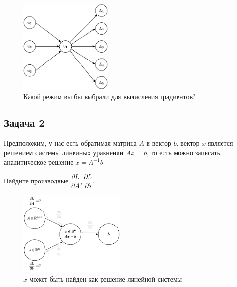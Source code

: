 \documentclass[
  russian,
  letterpaper,
  DIV=11,
  numbers=noendperiod]{scrartcl}
\begin{document}
\begin{figure}[H]

{\centering \includegraphics[width=1.82292in,height=\textheight,keepaspectratio]{ad_choose.pdf}

}

\caption{Какой режим вы бы выбрали для вычисления градиентов?}

\end{figure}%

\subsection{Задача 2}\label{ux437ux430ux434ux430ux447ux430-2}

Предположим, у нас есть обратимая матрица \(A\) и вектор \(b\), вектор
\(x\) является решением системы линейных уравнений \(Ax = b\), то есть
можно записать аналитическое решение \(x = A^{-1}b\).

\hfill\break
\hfill\break

\begin{tcolorbox}[enhanced jigsaw, colbacktitle=quarto-callout-color!10!white, toptitle=1mm, bottomrule=.15mm, left=2mm, opacitybacktitle=0.6, colframe=quarto-callout-color-frame, arc=.35mm, bottomtitle=1mm, colback=white, coltitle=black, title=\textcolor{quarto-callout-color}{\faInfo}\hspace{0.5em}{Question}, leftrule=.75mm, opacityback=0, rightrule=.15mm, toprule=.15mm, breakable, titlerule=0mm]

Найдите производные
\(\dfrac{\partial L}{\partial A}, \dfrac{\partial L}{\partial b}\).

\end{tcolorbox}

\begin{figure}[H]

{\centering \includegraphics[width=2.08333in,height=\textheight,keepaspectratio]{linear_least_squares_layer.pdf}

}

\caption{\(x\) может быть найден как решение линейной системы}

\end{figure}%
\end{document}
